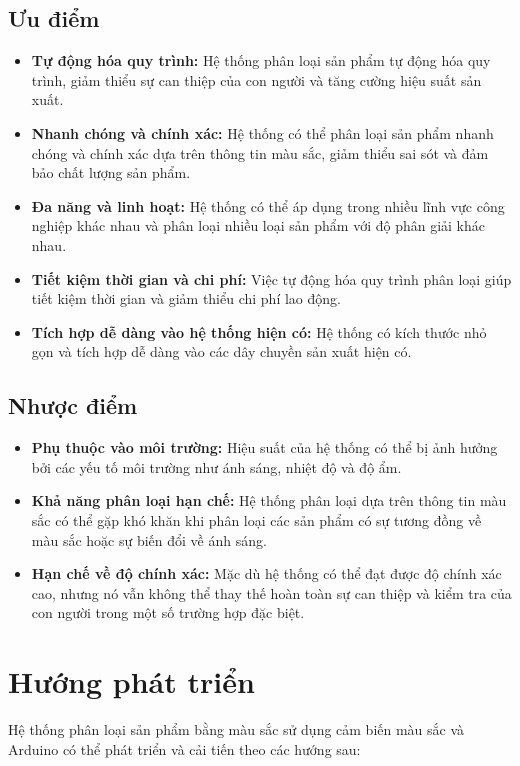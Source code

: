 \documentclass[12pt]{report}
\begin{document}
\subsection*{Ưu điểm}

\begin{itemize}[itemsep=0pt, parsep=0pt]
    \item \textbf{Tự động hóa quy trình:} Hệ thống phân loại sản phẩm tự động hóa quy trình, giảm thiểu sự can thiệp của con người và tăng cường hiệu suất sản xuất.
    \item \textbf{Nhanh chóng và chính xác:} Hệ thống có thể phân loại sản phẩm nhanh chóng và chính xác dựa trên thông tin màu sắc, giảm thiểu sai sót và đảm bảo chất lượng sản phẩm.
    \item \textbf{Đa năng và linh hoạt:} Hệ thống có thể áp dụng trong nhiều lĩnh vực công nghiệp khác nhau và phân loại nhiều loại sản phẩm với độ phân giải khác nhau.
    \item \textbf{Tiết kiệm thời gian và chi phí:} Việc tự động hóa quy trình phân loại giúp tiết kiệm thời gian và giảm thiểu chi phí lao động.
    \item \textbf{Tích hợp dễ dàng vào hệ thống hiện có:} Hệ thống có kích thước nhỏ gọn và tích hợp dễ dàng vào các dây chuyền sản xuất hiện có.
\end{itemize}

\subsection*{Nhược điểm}

\begin{itemize}[itemsep=0pt, parsep=0pt]

    \item \textbf{Phụ thuộc vào môi trường:} Hiệu suất của hệ thống có thể bị ảnh hưởng bởi các yếu tố môi trường như ánh sáng, nhiệt độ và độ ẩm.
    \item \textbf{Khả năng phân loại hạn chế:} Hệ thống phân loại dựa trên thông tin màu sắc có thể gặp khó khăn khi phân loại các sản phẩm có sự tương đồng về màu sắc hoặc sự biến đổi về ánh sáng.

    \item \textbf{Hạn chế về độ chính xác:} Mặc dù hệ thống có thể đạt được độ chính xác cao, nhưng nó vẫn không thể thay thế hoàn toàn sự can thiệp và kiểm tra của con người trong một số trường hợp đặc biệt.
\end{itemize}
\section{Hướng phát triển} 
Hệ thống phân loại sản phẩm bằng màu sắc sử dụng cảm biến màu sắc và Arduino có thể phát triển và cải tiến theo các hướng sau:
\end{document}
